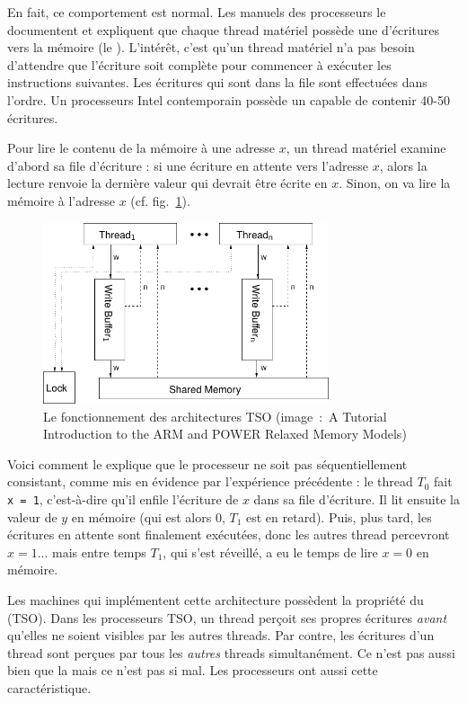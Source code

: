 En fait, ce comportement est \og normal\fg. Les manuels des processeurs
 le documentent et expliquent que chaque thread matériel possède une
 d'écritures vers la mémoire (le \og {}\fg). L'intérêt, c'est qu'un thread matériel n'a pas besoin d'attendre
que l'écriture soit complète pour commencer à exécuter les instructions
suivantes. Les écritures qui sont dans la file sont effectuées dans l'ordre. Un
processeurs Intel contemporain possède un  capable de
contenir 40-50 écritures.

Pour lire le contenu de la mémoire à une adresse $x$, un thread matériel examine
d'abord sa file d'écriture : si une écriture en attente vers l'adresse $x$,
alors la lecture renvoie la dernière valeur qui devrait être écrite en
$x$. Sinon, on va lire la mémoire à l'adresse $x$ (cf. fig.~\ref{fig:tso}).

\begin{figure}
  \centering
  \includegraphics[width=0.75\textwidth]{tso}
  \caption{Le fonctionnement des architectures TSO (image~:~A Tutorial
    Introduction to the ARM and POWER Relaxed Memory Models) \label{fig:tso}}
\end{figure}

Voici comment le  explique que le processeur ne soit
pas séquentiellement consistant, comme mis en évidence par l'expérience
précédente : le thread $T_0$ fait \texttt{x = 1}, c'est-à-dire qu'il
enfile l'écriture de $x$ dans sa file d'écriture. Il lit ensuite la valeur de
$y$ en mémoire (qui est alors 0, $T_1$ est en retard). Puis, plus tard, les
écritures en attente sont finalement exécutées, donc les autres thread
percevront $x=1$... mais entre temps $T_1$, qui s'est réveillé, a eu le temps de
lire $x=0$ en mémoire.

Les machines qui implémentent cette architecture possèdent la propriété du
 (TSO). Dans les processeurs TSO, un thread
perçoit ses propres écritures \emph{avant} qu'elles ne soient visibles par les
autres threads. Par contre, les écritures d'un thread sont perçues par tous les
\emph{autres} threads simultanément. Ce n'est pas aussi bien que la
 mais ce n'est pas si mal. Les processeurs
 ont aussi cette caractéristique.

